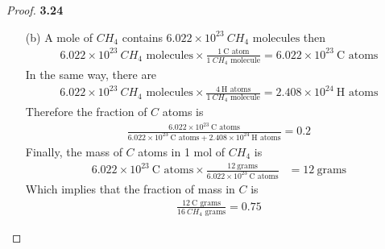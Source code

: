 \documentclass[11pt]{article}
\theoremstyle{definition}
\begin{document}
\begin{proof}{\textbf{3.24}}
\begin{itemize}
        \item [(b)] A mole of $CH_4$ contains
        $6.022\times 10^{23}~CH_4\text{ molecules}$ then
        \begin{align*}
            6.022\times 10^{23}~CH_4\text{ molecules}
            \times \frac{1~\text{C atom}}{1~CH_4\text{ molecule}}
            = 6.022\times 10^{23}~\text{C atoms}
        \end{align*}
        In the same way, there are 
        \begin{align*}
            6.022\times 10^{23}~CH_4\text{ molecules}
            \times \frac{4~\text{H atoms}}{1~CH_4\text{ molecule}}
            = 2.408\times 10^{24}~\text{H atoms}
        \end{align*}
        Therefore the fraction of $C$ atoms is
        \begin{align*}
            \frac
            {6.022\times 10^{23}~\text{C atoms}}
            {
                6.022\times 10^{23}~\text{C atoms}
                + 2.408\times 10^{24}~\text{H atoms}
            }
            = 0.2
        \end{align*}
        Finally, the mass of $C$ atoms in 1 mol of $CH_4$ is
        \begin{align*}
            6.022\times 10^{23}~\text{C atoms}
            \times \frac{12~\text{grams}}{6.022\times 10^{23}~\text{C atoms}}
            &= 12~\text{grams}
        \end{align*}
        Which implies that the fraction of mass in $C$ is
        \begin{align*}
            \frac{12~\text{C grams}}{16~CH_4\text{ grams}} = 0.75
        \end{align*}


\end{itemize}
\end{proof}
\end{document}
